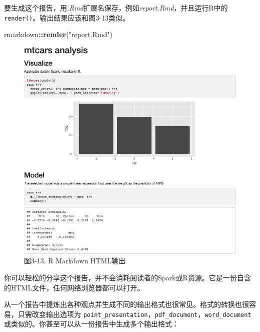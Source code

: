 \documentclass[
]{article}
\newenvironment{Shaded}{\begin{snugshade}}{\end{snugshade}}
\newcommand{\KeywordTok}[1]{\textcolor[rgb]{0.13,0.29,0.53}{\textbf{#1}}}
\newcommand{\NormalTok}[1]{#1}
\newcommand{\OperatorTok}[1]{\textcolor[rgb]{0.81,0.36,0.00}{\textbf{#1}}}
\newcommand{\StringTok}[1]{\textcolor[rgb]{0.31,0.60,0.02}{#1}}
\begin{document}
\begin{Shaded}
\end{Shaded}

要生成这个报告，用\emph{.Rmd}扩展名保存，例如\emph{report.Rmd}，并且运行R中的\texttt{render()}。输出结果应该和图3-13类似。

\begin{Shaded}
\begin{Highlighting}[]
\NormalTok{rmarkdown}\OperatorTok{::}\KeywordTok{render}\NormalTok{(}\StringTok{"report.Rmd"}\NormalTok{)}
\end{Highlighting}
\end{Shaded}

\begin{figure}
\centering
\includegraphics{figures/3_13.png}
\caption{图3-13. R Markdown HTML输出}
\end{figure}

你可以轻松的分享这个报告，并不会消耗阅读者的Spark或R资源。它是一份自含的HTML文件，任何网络浏览器都可以打开。

从一个报告中提炼出各种观点并生成不同的输出格式也很常见。格式的转换也很容易，只需改变输出选项为
\texttt{point\_presentation}，\texttt{pdf\_document}，\texttt{word\_document}或类似的。你甚至可以从一份报告中生成多个输出格式：
\end{document}
